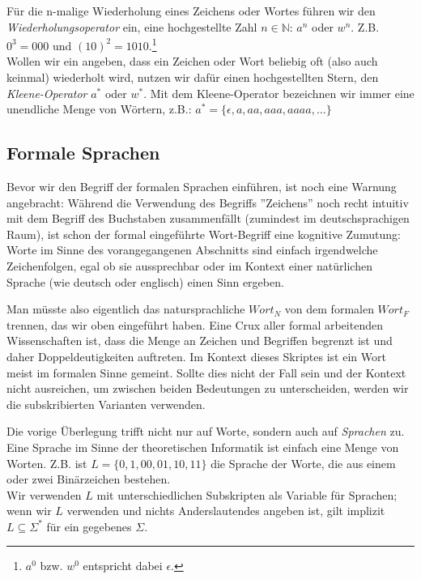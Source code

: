 \noindent
Für die n-malige Wiederholung eines Zeichens oder Wortes führen wir den \emph{Wiederholungsoperator}
ein, eine hochgestellte Zahl $n \in \mathbb{N}$: $a^n$ oder $w^n$.
Z.B. $0^3 = 000$ und $(10)^2 = 1010$.\footnote{$a^0$ bzw. $w^0$ entspricht dabei $\epsilon$.}\\

\noindent
Wollen wir ein angeben, dass ein Zeichen oder Wort beliebig oft (also auch keinmal) wiederholt
wird, nutzen wir dafür einen hochgestellten Stern, den \emph{Kleene-Operator} $a^*$ oder $w^*$.
Mit dem Kleene-Operator bezeichnen wir immer eine unendliche Menge von Wörtern, z.B.:
$a^* = \{\epsilon, a, aa, aaa, aaaa, \dots\}$

\subsection{Formale Sprachen}

Bevor wir den Begriff der formalen Sprachen einführen, ist noch eine Warnung angebracht:
Während die Verwendung des Begriffs ''Zeichens''
noch recht intuitiv mit dem Begriff des Buchstaben zusammenfällt
(zumindest im deutschsprachigen Raum),
ist schon der formal eingeführte Wort-Begriff eine kognitive Zumutung:
Worte im Sinne des vorangegangenen Abschnitts sind einfach irgendwelche Zeichenfolgen,
egal ob sie aussprechbar oder im Kontext einer natürlichen Sprache
(wie deutsch oder englisch) einen Sinn ergeben.

Man müsste also eigentlich das natursprachliche $Wort_N$ von dem formalen $Wort_F$ trennen,
das wir oben eingeführt haben.
Eine Crux aller formal arbeitenden Wissenschaften ist,
dass die Menge an Zeichen und Begriffen begrenzt ist und daher Doppeldeutigkeiten auftreten.
Im Kontext dieses Skriptes ist ein Wort meist im formalen Sinne gemeint.
Sollte dies nicht der Fall sein und der Kontext nicht ausreichen,
um zwischen beiden Bedeutungen zu unterscheiden,
werden wir die subskribierten Varianten verwenden.

Die vorige Überlegung trifft nicht nur auf Worte, sondern auch auf \emph{Sprachen} zu.
Eine Sprache im Sinne der theoretischen Informatik ist einfach eine Menge von Worten.
Z.B. ist $L = \{0, 1, 00, 01, 10, 11 \}$ die Sprache der Worte, die aus einem oder zwei Binärzeichen bestehen.\\

\noindent
Wir verwenden $L$ mit unterschiedlichen Subskripten als Variable für Sprachen;
wenn wir $L$ verwenden und nichts Anderslautendes angeben ist,
gilt implizit $L \subseteq \Sigma^*$ für ein gegebenes $\Sigma$.


